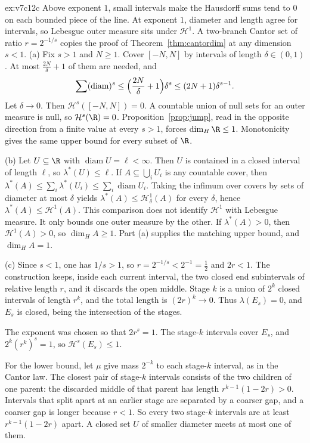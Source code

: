 \begin{solution}{ex:v7c12c}
\idea Above exponent $1$, small intervals make the Hausdorff sums tend to $0$ on each bounded piece of the line. At exponent $1$, diameter and
length agree for intervals, so Lebesgue outer measure sits under $\mathcal H^1$. A two-branch Cantor set of ratio $r=2^{-1/s}$ copies the
proof of Theorem~\ref{thm:cantordim} at any dimension $s<1$.
\writeup (a) Fix $s>1$ and $N\ge 1$. Cover $[-N,N]$ by intervals of length $\delta\in(0,1)$. At most $\frac{2N}{\delta}+1$ of them are needed, and
\[\sum(\operatorname{diam})^s\le\Bigl(\frac{2N}{\delta}+1\Bigr)\delta^s\le(2N+1)\delta^{s-1}.\]
Let $\delta\to 0$. Then $\mathcal H^s([-N,N])=0$. A countable union of null sets for an outer measure is null, so $\mathcal H^s(\R)=0$.
Proposition~\ref{prop:jump}, read in the opposite direction from a finite value at every $s>1$, forces $\dim_H\R\le 1$. Monotonicity gives the
same upper bound for every subset of $\R$.

(b) Let $U\subseteq\R$ with $\operatorname{diam}U=\ell<\infty$. Then $U$ is contained in a closed interval of length $\ell$, so $\lambda^*(U)\le\ell$. If
$A\subseteq\bigcup_i U_i$ is any countable cover, then $\lambda^*(A)\le\sum_i\lambda^*(U_i)\le\sum_i\operatorname{diam}U_i$. Taking the infimum over covers
by sets of diameter at most $\delta$ yields $\lambda^*(A)\le\mathcal H^1_\delta(A)$ for every $\delta$, hence $\lambda^*(A)\le\mathcal H^1(A)$.
This comparison does not identify $\mathcal H^1$ with Lebesgue measure. It only bounds one outer measure by the other. If $\lambda^*(A)>0$,
then $\mathcal H^1(A)>0$, so $\dim_H A\ge 1$. Part (a) supplies the matching upper bound, and $\dim_H A=1$.

(c) Since $s<1$, one has $1/s>1$, so $r=2^{-1/s}<2^{-1}=\frac12$ and $2r<1$. The construction keeps, inside each current interval, the two
closed end subintervals of relative length $r$, and it discards the open middle. Stage $k$ is a union of $2^k$ closed intervals of length
$r^k$, and the total length is $(2r)^k\to 0$. Thus $\lambda(E_s)=0$, and $E_s$ is closed, being the intersection of the stages.

The exponent was chosen so that $2r^s=1$. The stage-$k$ intervals cover $E_s$, and $2^k(r^k)^s=1$, so $\mathcal H^s(E_s)\le 1$.

For the lower bound, let $\mu$ give mass $2^{-k}$ to each stage-$k$ interval, as in the Cantor law. The closest pair of stage-$k$ intervals
consists of the two children of one parent: the discarded middle of that parent has length $r^{k-1}(1-2r)>0$. Intervals that split apart at an
earlier stage are separated by a coarser gap, and a coarser gap is longer because $r<1$. So every two stage-$k$ intervals are at least
$r^{k-1}(1-2r)$ apart. A closed set $U$ of smaller diameter meets at most one of them.


\end{solution}
